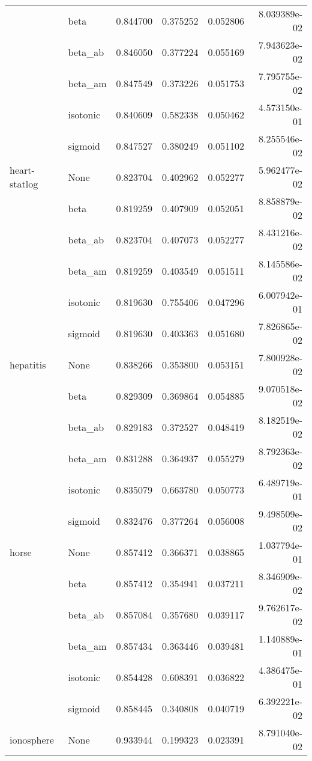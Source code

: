 \begin{tabular}{llrrrr}
        & beta &  0.844700 &  0.375252 &  0.052806 &  8.039389e-02 \\
        & beta\_ab &  0.846050 &  0.377224 &  0.055169 &  7.943623e-02 \\
        & beta\_am &  0.847549 &  0.373226 &  0.051753 &  7.795755e-02 \\
        & isotonic &  0.840609 &  0.582338 &  0.050462 &  4.573150e-01 \\
        & sigmoid &  0.847527 &  0.380249 &  0.051102 &  8.255546e-02 \\
heart-statlog & None &  0.823704 &  0.402962 &  0.052277 &  5.962477e-02 \\
        & beta &  0.819259 &  0.407909 &  0.052051 &  8.858879e-02 \\
        & beta\_ab &  0.823704 &  0.407073 &  0.052277 &  8.431216e-02 \\
        & beta\_am &  0.819259 &  0.403549 &  0.051511 &  8.145586e-02 \\
        & isotonic &  0.819630 &  0.755406 &  0.047296 &  6.007942e-01 \\
        & sigmoid &  0.819630 &  0.403363 &  0.051680 &  7.826865e-02 \\
hepatitis & None &  0.838266 &  0.353800 &  0.053151 &  7.800928e-02 \\
        & beta &  0.829309 &  0.369864 &  0.054885 &  9.070518e-02 \\
        & beta\_ab &  0.829183 &  0.372527 &  0.048419 &  8.182519e-02 \\
        & beta\_am &  0.831288 &  0.364937 &  0.055279 &  8.792363e-02 \\
        & isotonic &  0.835079 &  0.663780 &  0.050773 &  6.489719e-01 \\
        & sigmoid &  0.832476 &  0.377264 &  0.056008 &  9.498509e-02 \\
horse & None &  0.857412 &  0.366371 &  0.038865 &  1.037794e-01 \\
        & beta &  0.857412 &  0.354941 &  0.037211 &  8.346909e-02 \\
        & beta\_ab &  0.857084 &  0.357680 &  0.039117 &  9.762617e-02 \\
        & beta\_am &  0.857434 &  0.363446 &  0.039481 &  1.140889e-01 \\
        & isotonic &  0.854428 &  0.608391 &  0.036822 &  4.386475e-01 \\
        & sigmoid &  0.858445 &  0.340808 &  0.040719 &  6.392221e-02 \\
ionosphere & None &  0.933944 &  0.199323 &  0.023391 &  8.791040e-02 \\

\end{tabular}
